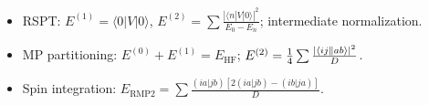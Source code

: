 \begin{summary}
\begin{itemize}
\item RSPT: $E^{(1)} = \langle 0|V|0\rangle$, $E^{(2)} = \sum \frac{|\langle n|V|0\rangle|^2}{E_0 - E_n}$; intermediate normalization.
\item MP partitioning: $E^{(0)} + E^{(1)} = E_{\text{HF}}$; $E^{(2)} = \frac{1}{4} \sum \frac{|\langle ij\Vert ab\rangle|^2}{D}$.
\item Spin integration: $E_{\text{RMP2}} = \sum \frac{(ia|jb)[2(ia|jb) - (ib|ja)]}{D}$.
\end{itemize}
\end{summary}
